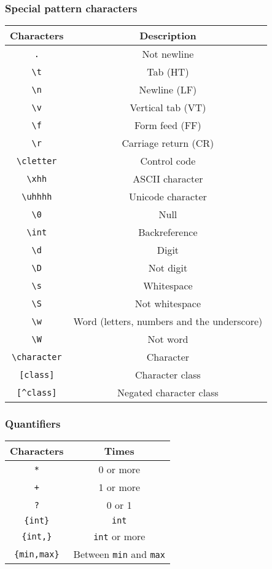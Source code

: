 \subsubsection{Special pattern characters}
\begin{center}
	\begin{tabular}{|c|c|}
		\hline
		Characters			&	Description\\	
		\hline
		\verb!.!			&	Not newline\\
		\hline
		\verb!\t!			&	Tab (HT)\\
		\hline
		\verb!\n!			&	Newline (LF)\\
		\hline
		\verb!\v!			&	Vertical tab (VT)\\
		\hline
		\verb!\f!			&	Form feed (FF)	\\
		\hline
		\verb!\r!			&	Carriage return (CR)\\
		\hline
		\verb!\cletter!		&	Control code	\\
		\hline
		\verb!\xhh!			&	ASCII character	\\
		\hline
		\verb!\uhhhh!		&	Unicode character\\
		\hline
		\verb!\0!			&	Null			\\
		\hline
		\verb!\int!			&	Backreference\\
		\hline
		\verb!\d!			&	Digit		\\
		\hline
		\verb!\D!			&	Not digit\\
		\hline
		\verb!\s!			&	Whitespace\\
		\hline
		\verb!\S!			&	Not whitespace\\
		\hline
		\verb!\w!			&	Word (letters, numbers and the underscore)\\	
		\hline
		\verb!\W!			&	Not word\\
		\hline
		\verb!\character!	&	Character		\\
		\hline
		\verb![class]!		&	Character class\\
		\hline
		\verb![^class]!		&	Negated character class	\\
		\hline
	\end{tabular}
\end{center}
\subsubsection{Quantifiers}
\begin{center}
	\begin{tabular}{|c|c|}
		\hline
		Characters			&	Times			\\				
		\hline
		\verb!*!			&	0 or more			\\		
		\hline
		\verb!+!			&	1 or more				\\
		\hline
		\verb!?!			&	0 or 1				\\
		\hline
		\verb!{int}!		&	\verb!int!		\\
		\hline
		\verb!{int,}!		&	\verb!int! or more				\\	
		\hline
		\verb!{min,max}!	&	Between \verb!min! and \verb!max!	\\
		\hline
	\end{tabular}
\end{center}

